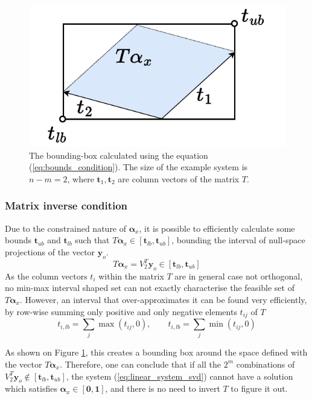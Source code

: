 \begin{figure}
\vspace{-1.7cm}
    \centering
    \includegraphics[width=\linewidth]{Papers/images/matrix_condition.pdf}
    \caption{The bounding-box calculated using the equation (\ref{eq:bounds_condition}). The size of the example system is $n\!-\!m\!=\!2$, where $\bm{t}_1,\bm{t}_2$ are column vectors of the matrix $T$.}
    \label{fig:matrix_condition}
\end{figure}

\subsubsection{Matrix inverse condition}
Due to the constrained nature of $\bm{\alpha}_x$, it is possible to efficiently calculate some bounds ${\bm{t}_{ub}}$ and $\bm{t}_{lb}$ such that $T\bm{\alpha}_x  \in [\bm{t}_{lb}, \bm{t}_{ub}]$, bounding the interval of null-space projections of the vector $\bm{y}_o$.
\begin{equation}
    T\bm{\alpha}_x  = V_2^T\bm{y}_o \in [\bm{t}_{lb}, \bm{t}_{ub}]\label{eq:necesassry_condition}
\end{equation}
As the column vectors $t_i$ within the matrix $T$ are in general case not orthogonal, no min-max interval shaped set can not exactly characterise the feasible set of $T\bm{\alpha}_x$. However, an interval that over-approximates it can be found very efficiently, by row-wise summing only positive and only negative elements $t_{ij}$ of  $T$
\begin{equation}
t_{i,lb} = \sum_j \max(t_{ij}, 0), \qquad
t_{i,lb} = \sum_j \min(t_{ij}, 0) 
\label{eq:bounds_condition}
\end{equation}

As shown on Figure \ref{fig:matrix_condition}, this creates a bounding box around the space defined with the vector $T\bm{\alpha}_x$. Therefore, one can conclude that if all the $2^m$ combinations of $V_2^T\bm{y}_o \notin [\bm{t}_{lb}, \bm{t}_{ub}] $, the system (\ref{eq:linear_system_svd}) cannot have a solution which satisfies $\bm{\alpha}_x \in [\bm{0},\bm{1}]$, and there is no need to invert $T$ to figure it out.

